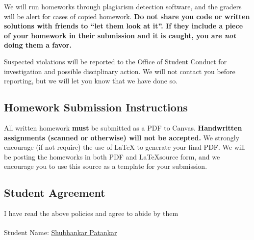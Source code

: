 \documentclass[english]{article}
\begin{document}
We will run homeworks through plagiarism detection software, and the graders will be alert for cases of copied homework.
{\bf Do not share you code or written solutions  with friends to ``let them look at it''. If they include a piece of your
homework in their submission and it is caught, you are {\it not} doing them a favor.}

Suspected violations will be reported to the Office of Student Conduct
for investigation and possible disciplinary action. We will not
contact you before reporting, but we will let you know that we have
done so.

\subsection*{Homework Submission Instructions}

All written homework {\bf must} be submitted as a PDF to Canvas. {\bf
  Handwritten assignments (scanned or otherwise) will not be
  accepted.}  We strongly encourage (if not require) the use of \LaTeX
to generate your final PDF. We will be posting the homeworks in both
PDF and \LaTeX source form, and we encourage you to use this source as
a template for your submission.

\subsection*{Student Agreement}
I have read the above policies and agree to abide by them
\\ \\
Student Name: \underline{Shubhankar Patankar}
\end{document}
